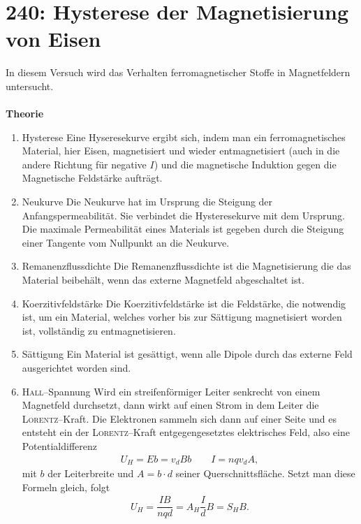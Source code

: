 \section{240: Hysterese der Magnetisierung von Eisen}
In diesem Versuch wird das Verhalten ferromagnetischer Stoffe in Magnetfeldern untersucht.\\\\
\textbf{Theorie} 
\begin{enumerate}[label=--]
        \item Hysterese \hspace{25pt}
                Eine Hyseresekurve ergibt sich, indem man ein ferromagnetisches Material, hier Eisen, magnetisiert und wieder entmagnetisiert (auch in die andere Richtung für negative $I$) und die magnetische Induktion gegen die Magnetische Feldstärke aufträgt.
        \item Neukurve \hspace{25pt}
                Die Neukurve hat im Ursprung die Steigung der Anfangspermeabilität.
                Sie verbindet die Hysteresekurve mit dem Ursprung.
                Die maximale Permeabilität eines Materials ist gegeben durch die Steigung einer Tangente vom Nullpunkt an die Neukurve.
        \item Remanenzflussdichte \hspace{25pt}
                Die Remanenzflussdichte ist die Magnetisierung die das Material beibehält, wenn das externe Magnetfeld abgeschaltet ist.
        \item Koerzitivfeldstärke \hspace{25pt}
                Die Koerzitivfeldstärke ist die Feldstärke, die notwendig ist, um ein Material, welches vorher bis zur Sättigung magnetisiert worden ist, vollständig zu entmagnetisieren.
        \item Sättigung \hspace{25pt}
                Ein Material ist gesättigt, wenn alle Dipole durch das externe Feld ausgerichtet worden sind.
        \item \textsc{Hall}--Spannung \hspace{25pt}
                Wird ein streifenförmiger Leiter senkrecht von einem Magnetfeld durchsetzt, dann wirkt auf einen Strom in dem Leiter die \textsc{Lorentz}--Kraft.
                Die Elektronen sammeln sich dann auf einer Seite und es entsteht ein der \textsc{Lorentz}--Kraft entgegengesetztes elektrisches Feld, also eine Potentialdifferenz
                \begin{align} 
                        U_H=Eb=v_dBb\qquad I=nqv_dA
                ,\end{align} 
                mit $b$ der Leiterbreite und $A=b \cdot d$ seiner Querschnittsfläche.
                Setzt man diese Formeln gleich, folgt
                \begin{align} 
                        U_H=\dfrac{IB}{nqd}=A_H\dfrac{I}{d}B=S_HB
                .\end{align} 
                
\end{enumerate}

